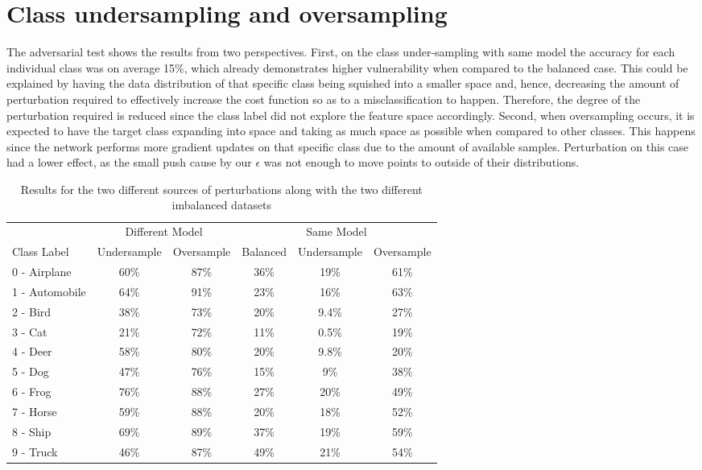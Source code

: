 \section{Class undersampling and oversampling}

The adversarial test shows the results from two perspectives. First, on the class under-sampling with same model the accuracy for each individual class was on average 15\%, which already demonstrates higher vulnerability when compared to the balanced case. This could be explained by having the data distribution of that specific class being squished into a smaller space and, hence, decreasing the amount of perturbation required to effectively increase the cost function so as to a misclassification to happen. Therefore, the degree of the perturbation required is reduced since the class label did not explore the feature space accordingly. Second, when oversampling occurs, it is expected to have the target class expanding into space and taking as much space as possible when compared to other classes. This happens since the network performs more gradient updates on that specific class due to the amount of available samples. Perturbation on this case had a lower effect, as the small push cause by our $\epsilon$ was not enough to move points to outside of their distributions.



\begin{table}[H]
	\centering
	
	\begin{tabular}{lccccc}
		\toprule
		&\multicolumn{2}{c}{Different Model}
		&\multicolumn{3}{c}{Same Model}
		\\\cmidrule(r){2-3}\cmidrule(l){4-6}
		Class Label &Undersample &Oversample &Balanced &Undersample &Oversample \\
		\midrule
		0 - Airplane &60\%& 87\% &36\%& 19\%    & 61\% \\
		1 - Automobile &64\%& 91\% &23\%& 16\%    & 63\% \\
		2 - Bird &38\%& 73\% &20\%& 9.4\%    & 27\% \\
		3 - Cat &21\%& 72\% &11\%& 0.5\%    & 19\% \\
		4 - Deer &58\%& 80\% &20\%& 9.8\%    & 20\% \\
		5 - Dog &47\%& 76\% &15\%& 9\%    & 38\% \\
		6 - Frog &76\%& 88\% &27\%& 20\%    & 49\% \\
		7 - Horse &59\%& 88\% &20\%& 18\%    & 52\% \\
		8 - Ship &69\%& 89\% &37\%& 19\%    & 59\% \\
		9 - Truck &46\%& 87\% &49\%& 21\%    & 54\% \\
		\bottomrule
	\end{tabular}
	\caption{Results for the two different sources of perturbations along with the two different imbalanced datasets}
	\label{tbl:results}
\end{table}

